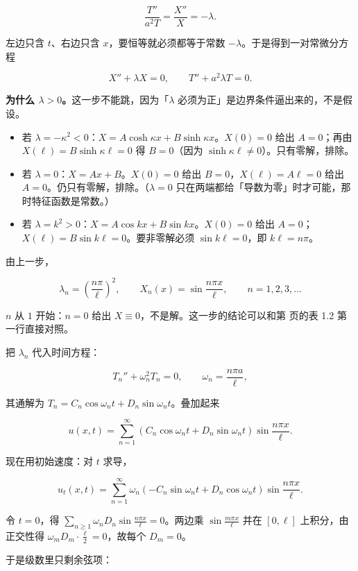 \documentclass[11pt]{ctexart}
\begin{document}
\[
\frac{T''}{a^2T}=\frac{X''}{X}=-\lambda .
\]

左边只含 $t$、右边只含 $x$，要恒等就必须都等于常数 $-\lambda$。于是得到一对常微分方程

\[
X''+\lambda X=0,
\qquad
T''+a^2\lambda T=0 .
\]

\textbf{为什么 $\lambda>0$。}这一步不能跳，因为「$\lambda$ 必须为正」是边界条件逼出来的，不是假设。

\begin{itemize}
  \item 若 $\lambda=-\kappa^2<0$：$X=A\cosh\kappa x+B\sinh\kappa x$。$X(0)=0$ 给出 $A=0$；再由 $X(\ell)=B\sinh\kappa\ell=0$ 得 $B=0$（因为 $\sinh\kappa\ell\ne0$）。只有零解，排除。
  \item 若 $\lambda=0$：$X=Ax+B$。$X(0)=0$ 给出 $B=0$，$X(\ell)=A\ell=0$ 给出 $A=0$。仍只有零解，排除。（$\lambda=0$ 只在两端都给「导数为零」时才可能，那时特征函数是常数。）
  \item 若 $\lambda=k^2>0$：$X=A\cos kx+B\sin kx$。$X(0)=0$ 给出 $A=0$；$X(\ell)=B\sin k\ell=0$。要非零解必须 $\sin k\ell=0$，即 $k\ell=n\pi$。
\end{itemize}


由上一步，

\[
\lambda_n=\left(\frac{n\pi}{\ell}\right)^2,
\qquad
X_n(x)=\sin\frac{n\pi x}{\ell},
\qquad n=1,2,3,\dots
\]

$n$ 从 $1$ 开始：$n=0$ 给出 $X\equiv0$，不是解。这一步的结论可以和第 \pageref{sec:s1} 页的表 1.2 第一行直接对照。


把 $\lambda_n$ 代入时间方程：

\[
T_n''+\omega_n^2T_n=0,
\qquad
\omega_n=\frac{n\pi a}{\ell},
\]

其通解为 $T_n=C_n\cos\omega_nt+D_n\sin\omega_nt$。叠加起来

\[
u(x,t)=\sum_{n=1}^{\infty}\left(C_n\cos\omega_nt+D_n\sin\omega_nt\right)\sin\frac{n\pi x}{\ell}.
\]

现在用初始速度：对 $t$ 求导，

\[
u_t(x,t)=\sum_{n=1}^{\infty}\omega_n\left(-C_n\sin\omega_nt+D_n\cos\omega_nt\right)\sin\frac{n\pi x}{\ell}.
\]

令 $t=0$，得 $\sum_{n\ge1}\omega_nD_n\sin\frac{n\pi x}{\ell}=0$。两边乘 $\sin\frac{m\pi x}{\ell}$ 并在 $[0,\ell]$ 上积分，由正交性得 $\omega_mD_m\cdot\frac{\ell}{2}=0$，故每个 $D_m=0$。

于是级数里只剩余弦项：
\end{document}
